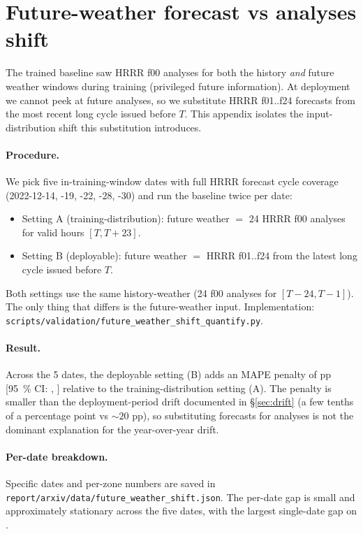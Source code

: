 
\section{Future-weather forecast vs analyses shift}
\label{app:forecast_shift}

The trained baseline saw HRRR f00 analyses for both the history
\emph{and} future weather windows during training (privileged future
information). At deployment we cannot peek at future analyses, so we
substitute HRRR f01..f24 forecasts from the most recent long cycle
issued before $T$. This appendix isolates the input-distribution shift
this substitution introduces.

\paragraph{Procedure.}
We pick five in-training-window dates with full HRRR forecast cycle
coverage (2022-12-14, -19, -22, -28, -30) and run the baseline twice
per date:
\begin{itemize}\setlength\itemsep{1pt}
  \item Setting A (training-distribution): future weather $=$ 24 HRRR
    f00 analyses for valid hours $[T, T+23]$.
  \item Setting B (deployable):              future weather $=$ HRRR
    f01..f24 from the latest long cycle issued before $T$.
\end{itemize}
Both settings use the same history-weather (24 f00 analyses for
$[T-24, T-1]$). The only thing that differs is the future-weather
input. Implementation:
\texttt{scripts/validation/future\_weather\_shift\_quantify.py}.

\paragraph{Result.}
Across the 5 dates, the deployable setting (B) adds an MAPE penalty of
\PHFCSHIFTPP{} pp [95~\% CI: \PHFCSHIFTLO{}, \PHFCSHIFTHI{}] relative
to the training-distribution setting (A). The penalty is smaller than
the deployment-period drift documented in §\ref{sec:drift} (a few
tenths of a percentage point vs $\sim 20$ pp), so substituting
forecasts for analyses is not the dominant explanation for the
year-over-year drift.

\paragraph{Per-date breakdown.}
Specific dates and per-zone numbers are saved in
\texttt{report/arxiv/data/future\_weather\_shift.json}. The per-date
gap is small and approximately stationary across the five dates, with
the largest single-date gap on \PHFCMAXDATE{}.
